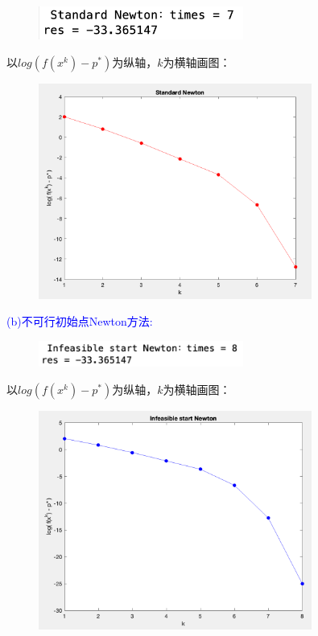 \documentclass{article}
\begin{document}
\begin{figure}[H] 
    \centering 
    \includegraphics[width=0.6\textwidth]{Newtonres1.png}
\end{figure}
以$log(f(x^k) - p^*)$为纵轴，$k$为横轴画图：\\
\begin{figure}[H] 
    \centering 
    \includegraphics[width=0.8\textwidth]{Newtonfig1.png}
\end{figure}

\textcolor{blue}{(b)不可行初始点Newton方法:}\\
\begin{figure}[H] 
    \centering 
    \includegraphics[width=0.6\textwidth]{Newtonres2.png}
\end{figure}
以$log(f(x^k) - p^*)$为纵轴，$k$为横轴画图：
\begin{figure}[H] 
    \centering 
    \includegraphics[width=0.8\textwidth]{Newtonfig2.png}
\end{figure}
\end{document}
